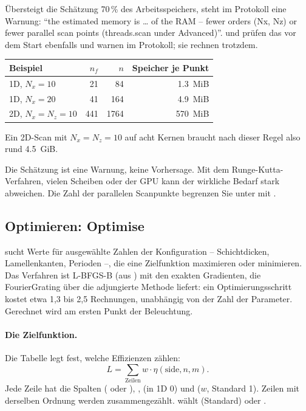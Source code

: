Übersteigt die Schätzung 70\,\% des Arbeitsspeichers, steht im Protokoll eine Warnung: \enquote{the
estimated memory is \dots{} of the RAM – fewer orders (Nx, Nz) or fewer parallel scan points
(threads.scan under Advanced)}.  und  prüfen das vor dem Start ebenfalls und
warnen im Protokoll; sie rechnen trotzdem.

\begin{center}
\begin{tabular}{lrrr}
\toprule
Beispiel & $n_f$ & $n$ & Speicher je Punkt \\
\midrule
1D, $N_x = 10$ & 21 & 84 & \qty{1.3}{MiB} \\
1D, $N_x = 20$ & 41 & 164 & \qty{4.9}{MiB} \\
2D, $N_x = N_z = 10$ & 441 & 1764 & \qty{570}{MiB} \\
\bottomrule
\end{tabular}
\end{center}

Ein 2D-Scan mit $N_x = N_z = 10$ auf acht Kernen braucht nach dieser Regel also rund
\qty{4.5}{GiB}.

\begin{hinweis}
Die Schätzung ist eine Warnung, keine Vorhersage. Mit dem Runge-Kutta-Verfahren, vielen Scheiben
oder der GPU kann der wirkliche Bedarf stark abweichen. Die Zahl der parallelen Scanpunkte begrenzen
Sie unter  mit .
\end{hinweis}

\subsection{Optimieren: Optimise}\label{sec:fg-optimieren}

 sucht Werte für ausgewählte Zahlen der Konfiguration -- Schichtdicken,
Lamellenkanten, Perioden --, die eine Zielfunktion maximieren oder minimieren. Das Verfahren ist
L-BFGS-B (aus ) mit den exakten Gradienten, die FourierGrating über die adjungierte
Methode liefert: ein Optimierungsschritt kostet etwa 1,3 bis 2,5 Rechnungen, unabhängig von der Zahl
der Parameter. Gerechnet wird am ersten Punkt der Beleuchtung.

\paragraph{Die Zielfunktion.} Die Tabelle 
legt fest, welche Effizienzen zählen:
\[
  L = \sum_\text{Zeilen} w \cdot \eta(\text{side}, n, m).
\]
Jede Zeile hat die Spalten  ( oder ), ,  (in 1D 0) und
 ($w$, Standard 1). Zeilen mit derselben Ordnung werden zusammengezählt.  wählt
 (Standard) oder .

